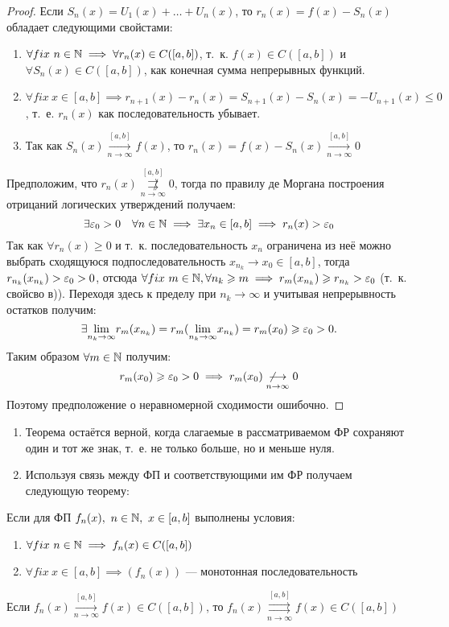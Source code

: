 \documentclass[../../main.tex]{subfiles}
\begin{document}
\begin{proof}
Если $S_n(x) = U_1(x) + \ldots + U_n(x)$, то $r_n(x) = f(x) - S_n(x)$ обладает
следующими свойстами:
	\begin{enumerate}
		\item $\forall fix \ n \in \mathbb{N} \implies 
	\forall r_n(x) \in C([a,b])$, т.~к. $f(x) \in C([a,b])$ и
	$\forall S_n(x) \in C([a,b])$, как конечная сумма непрерывных функций.
		\item $\forall fix \ x \in [a,b] \implies 
	r_{n+1}(x) - r_n(x) = S_{n+1}(x) - S_n(x) = -U_{n+1}(x) \leq 0$, т.~е.
	$r_n(x)$ как последовательность убывает.
		\item Так как $S_n(x) \overset{[a,b]}
	{\underset{n \to \infty}\longrightarrow} f(x)$, то 
	$r_n(x) = f(x) - S_n(x) \overset{[a,b]}
	{\underset{n \to \infty}\longrightarrow} 0$
	\end{enumerate}
Предположим, что $r_n(x) \overset{[a,b]}
{\underset{n \to \infty}{\not \rightrightarrows}} 0$, тогда по правилу
де Моргана построения отрицаний логических утверждений получаем: 
\[
\exists \varepsilon_0 > 0 \quad \forall n \in \mathbb{N} \implies 
\exists x_n \in [a,b] \implies r_n(x) > \varepsilon_0
\]
Так как $\forall r_n(x) \geq 0$ и т.~к. последовательность $x_n$ ограничена
из неё можно выбрать сходящуюся подпоследовательность 
$x_{n_k} \to x_0 \in [a,b]$, тогда $r_{n_k}(x_{n_k}) > \varepsilon_0 > 0$, отсюда
$\forall fix \ m \in \mathbb{N}, \forall n_k \geqslant m \implies r_m(x_{n_k}) \geqslant
r_{n_k} > \varepsilon_0$ (т.~к. свойсво в)). Переходя здесь к пределу при 
$n_k \to \infty$ и учитывая непрерывность остатков получим:
\[
\exists \underset{n_k \to \infty}{\lim} r_m(x_{n_k}) = 
r_m(\underset{n_k \to \infty}{\lim}x_{n_k}) = r_m(x_0) \geqslant
\varepsilon_0 > 0.
\]
Таким образом $\forall m \in \mathbb{N}$ получим: 
\[
r_m(x_0) \geqslant \varepsilon_0 > 0 \implies
r_m(x_0) \underset{n \to \infty}{\not \longrightarrow} 0
\]
Поэтому предположение о неравномерной сходимости ошибочно.
\end{proof}

\begin{rem}
	\begin{enumerate}
		\item Теорема остаётся верной, когда слагаемые в рассматриваемом ФР
	сохраняют один и тот же знак, т.~е. не только больше, но и меньше нуля.
		\item Используя связь между ФП и соответствующими им ФР получаем
	следующую теорему:
	\end{enumerate}
\end{rem}	
\begin{thm}
Если для ФП $f_n(x),\ n \in \mathbb{N},\ x \in [a,b]$ выполнены условия:
	\begin{enumerate}
		\item $\forall fix \ n \in \mathbb{N} \implies
		f_n(x) \in C([a,b])$
		\item $\forall fix \ x \in [a,b] \implies
		(f_n(x))$ --- монотонная последовательность 
	\end{enumerate}			
Если $f_n(x) \overset{[a,b]}
{\underset{n \to \infty}\longrightarrow} f(x) \in C([a,b])$, то
$f_n(x) \overset{[a,b]}
{\underset{n \to \infty}\rightrightarrows} f(x) \in C([a,b])$
\end{thm}  
\end{document}
